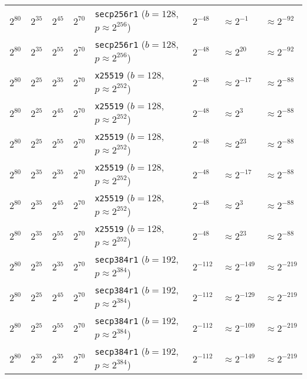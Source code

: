 \begin{table}[p]
{\begin{tabular}{@{}llllllll@{}}
$2^{80}$	&$2^{35}$	&$2^{45}$	&$2^{70}$	&\texttt{secp256r1} ($b \!=\! 128$, \! $p \!\approx\! 2^{256}$)	&$2^{-48}$	&$\approx 2^{-1}$	& \cellcolor{green!25}$\approx 2^{-92}$	\\
$2^{80}$	&$2^{35}$	&$2^{55}$	&$2^{70}$	&\texttt{secp256r1} ($b \!=\! 128$, \! $p \!\approx\! 2^{256}$)	&$2^{-48}$	&$\approx 2^{20}$	& \cellcolor{green!25}$\approx 2^{-92}$	\\
\midrule
$2^{80}$	&$2^{25}$	&$2^{35}$	&$2^{70}$	&\texttt{x25519} ($b \!=\! 128$, \! $p \!\approx\! 2^{252}$)	&$2^{-48}$	&$\approx 2^{-17}$	& \cellcolor{green!25}$\approx 2^{-88}$	\\
$2^{80}$	&$2^{25}$	&$2^{45}$	&$2^{70}$	&\texttt{x25519} ($b \!=\! 128$, \! $p \!\approx\! 2^{252}$)	&$2^{-48}$	&$\approx 2^{3}$	& \cellcolor{green!25}$\approx 2^{-88}$	\\
$2^{80}$	&$2^{25}$	&$2^{55}$	&$2^{70}$	&\texttt{x25519} ($b \!=\! 128$, \! $p \!\approx\! 2^{252}$)	&$2^{-48}$	&$\approx 2^{23}$	& \cellcolor{green!25}$\approx 2^{-88}$	\\
$2^{80}$	&$2^{35}$	&$2^{35}$	&$2^{70}$	&\texttt{x25519} ($b \!=\! 128$, \! $p \!\approx\! 2^{252}$)	&$2^{-48}$	&$\approx 2^{-17}$	& \cellcolor{green!25}$\approx 2^{-88}$	\\
$2^{80}$	&$2^{35}$	&$2^{45}$	&$2^{70}$	&\texttt{x25519} ($b \!=\! 128$, \! $p \!\approx\! 2^{252}$)	&$2^{-48}$	&$\approx 2^{3}$	& \cellcolor{green!25}$\approx 2^{-88}$	\\
$2^{80}$	&$2^{35}$	&$2^{55}$	&$2^{70}$	&\texttt{x25519} ($b \!=\! 128$, \! $p \!\approx\! 2^{252}$)	&$2^{-48}$	&$\approx 2^{23}$	& \cellcolor{green!25}$\approx 2^{-88}$	\\
\midrule
$2^{80}$	&$2^{25}$	&$2^{35}$	&$2^{70}$	&\texttt{secp384r1} ($b \!=\! 192$, \! $p \!\approx\! 2^{384}$)	&$2^{-112}$	&\cellcolor{green!25}$\approx 2^{-149}$	&\cellcolor{green!25}$\approx 2^{-219}$	\\
$2^{80}$	&$2^{25}$	&$2^{45}$	&$2^{70}$	&\texttt{secp384r1} ($b \!=\! 192$, \! $p \!\approx\! 2^{384}$)	&$2^{-112}$	&\cellcolor{green!25}$\approx 2^{-129}$	&\cellcolor{green!25}$\approx 2^{-219}$	\\
$2^{80}$	&$2^{25}$	&$2^{55}$	&$2^{70}$	&\texttt{secp384r1} ($b \!=\! 192$, \! $p \!\approx\! 2^{384}$)	&$2^{-112}$	&$\approx 2^{-109}$	& \cellcolor{green!25}$\approx 2^{-219}$	\\
$2^{80}$	&$2^{35}$	&$2^{35}$	&$2^{70}$	&\texttt{secp384r1} ($b \!=\! 192$, \! $p \!\approx\! 2^{384}$)	&$2^{-112}$	&\cellcolor{green!25}$\approx 2^{-149}$	&\cellcolor{green!25}$\approx 2^{-219}$	\\

\end{tabular}}
\end{table}
